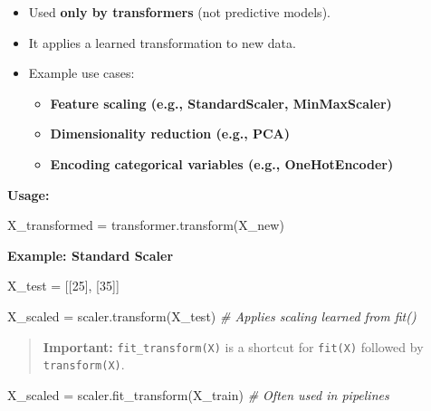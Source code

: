 \documentclass{article}
\providecommand{\tightlist}{%
      \setlength{\itemsep}{0pt}\setlength{\parskip}{0pt}}
\newenvironment{Shaded}{}{}
\newcommand{\DecValTok}[1]{\textcolor[rgb]{0.25,0.63,0.44}{{#1}}}
\newcommand{\CommentTok}[1]{\textcolor[rgb]{0.38,0.63,0.69}{\textit{{#1}}}}
\newcommand{\NormalTok}[1]{{#1}}
\newcommand{\OperatorTok}[1]{\textcolor[rgb]{0.40,0.40,0.40}{{#1}}}
\begin{document}
\begin{itemize}
\tightlist
\item
  Used \textbf{only by transformers} (not predictive models).
\item
  It applies a learned transformation to new data.
\item
  Example use cases:

  \begin{itemize}
  \tightlist
  \item
    \textbf{Feature scaling (e.g., StandardScaler, MinMaxScaler)}
  \item
    \textbf{Dimensionality reduction (e.g., PCA)}
  \item
    \textbf{Encoding categorical variables (e.g., OneHotEncoder)}
  \end{itemize}
\end{itemize}

\textbf{Usage:}

\begin{Shaded}
\begin{Highlighting}[]
\NormalTok{X\_transformed }\OperatorTok{=}\NormalTok{ transformer.transform(X\_new)}
\end{Highlighting}
\end{Shaded}

\textbf{Example: Standard Scaler}

\begin{Shaded}
\begin{Highlighting}[]
\NormalTok{X\_test }\OperatorTok{=}\NormalTok{ [[}\DecValTok{25}\NormalTok{], [}\DecValTok{35}\NormalTok{]]}

\NormalTok{X\_scaled }\OperatorTok{=}\NormalTok{ scaler.transform(X\_test)  }\CommentTok{\# Applies scaling learned from fit()}
\end{Highlighting}
\end{Shaded}

\begin{quote}
\textbf{Important:} \texttt{fit\_transform(X)} is a shortcut for
\texttt{fit(X)} followed by \texttt{transform(X)}.
\end{quote}

\begin{Shaded}
\begin{Highlighting}[]
\NormalTok{X\_scaled }\OperatorTok{=}\NormalTok{ scaler.fit\_transform(X\_train)  }\CommentTok{\# Often used in pipelines}
\end{Highlighting}
\end{Shaded}
\end{document}
